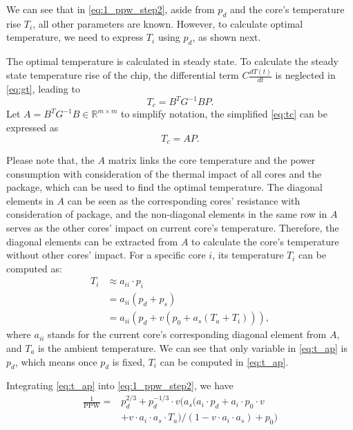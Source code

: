 We can see that in \eqref{eq:1_ppw_step2}, aside from $p_{d}$ and the core's temperature rise $T_{i}$, all other parameters are known. However, to calculate optimal temperature, we need to express $T_{i}$ using $p_{d}$, as shown next.

The optimal temperature is calculated in steady state. To calculate the steady state temperature rise of the chip, the differential term $C\frac{dT(t)}{dt}$ is neglected in 
\eqref{eq:gt}, leading to
\begin{equation}\label{eq:tc}
T_{c} = B^{T}G^{-1}BP.
\end{equation}
Let $A = B^{T}G^{-1}B \in \mathbb{R}^{m \times m}$ to simplify notation, the simplified 
\eqref{eq:tc} can be expressed as
\begin{equation}\label{sim_tc}
T_{c} = AP.
\end{equation}

Please note that, the $A$ matrix links the core temperature and the power consumption with consideration of the thermal impact of all cores and the package, which can be used to find the optimal temperature. The diagonal elements in $A$ can be seen as the corresponding cores' resistance with consideration of package, and the non-diagonal elements in the same row in $A$ serves as the other cores' impact on current core's temperature. Therefore, the diagonal elements can be extracted from $A$ to calculate the core's temperature without other cores' impact. For a specific core $i$, its temperature $T_{i}$ can be computed as:
\begin{equation}\label{eq:t_ap}
\begin{split}
T_{i}&\approx a_{ii} \cdot p_{i}\\
&=a_{ii}(p_{d}+p_{s})\\
&=a_{ii}(p_{d}+v (p_{0}+a_{s}(T_{a}+T_{i}))),
\end{split}
\end{equation}
where $a_{ii}$ stands for the current core's corresponding diagonal element from $A$, and $T_{a}$ is the ambient temperature. We can see that only variable in \eqref{eq:t_ap} is $p_{d}$, which means once $p_{d}$ is fixed, $T_{i}$ can be computed in \eqref{eq:t_ap}.



Integrating \eqref{eq:t_ap} into \eqref{eq:1_ppw_step2}, we have
\begin{equation}\label{eq:1_ppw_step3}
\begin{split}
\frac{1}{\text{PPW}} = &p_{d}^{2/3}+p_{d}^{-1/3}\cdot v(a_{s}(a_{i} \cdot p_{d}+a_{i} \cdot p_{0} \cdot v\\
 &+ v \cdot a_{i} \cdot a_{s} \cdot T_{a})/(1-v \cdot a_{i} \cdot a_{s})+p_{0})
\end{split}
\end{equation}

